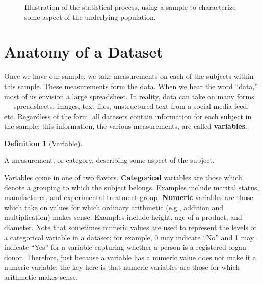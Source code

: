 \documentclass[
  letterpaper,
  DIV=11,
  numbers=noendperiod]{scrreprt}
\theoremstyle{plain}
\theoremstyle{definition}
\theoremstyle{definition}
\newtheorem{definition}{Definition}[chapter]
\theoremstyle{remark}
\begin{document}
\begin{figure}


\caption{\label{fig-basics-statistical-process}Illustration of the
statistical process, using a sample to characterize some aspect of the
underlying population.}

\end{figure}%

\section{Anatomy of a Dataset}\label{anatomy-of-a-dataset}

Once we have our sample, we take measurements on each of the subjects
within this sample. These measurements form the data. When we hear the
word ``data,'' most of us envision a large spreadsheet. In reality, data
can take on many forms --- spreadsheets, images, text files,
unstructured text from a social media feed, etc. Regardless of the form,
all datasets contain information for each subject in the sample; this
information, the various measurements, are called \textbf{variables}.

\begin{definition}[Variable]\protect\hypertarget{def-variable}{}\label{def-variable}

A measurement, or category, describing some aspect of the subject.

\end{definition}

Variables come in one of two flavors. \textbf{Categorical} variables are
those which denote a grouping to which the subject belongs. Examples
include marital status, manufacturer, and experimental treatment group.
\textbf{Numeric} variables are those which take on values for which
ordinary arithmetic (e.g., addition and multiplication) makes sense.
Examples include height, age of a product, and diameter. Note that
sometimes numeric values are used to represent the levels of a
categorical variable in a dataset; for example, 0 may indicate ``No''
and 1 may indicate ``Yes'' for a variable capturing whether a person is
a registered organ donor. Therefore, just because a variable has a
numeric value does not make it a numeric variable; the key here is that
numeric variables are those for which arithmetic makes sense.
\end{document}
